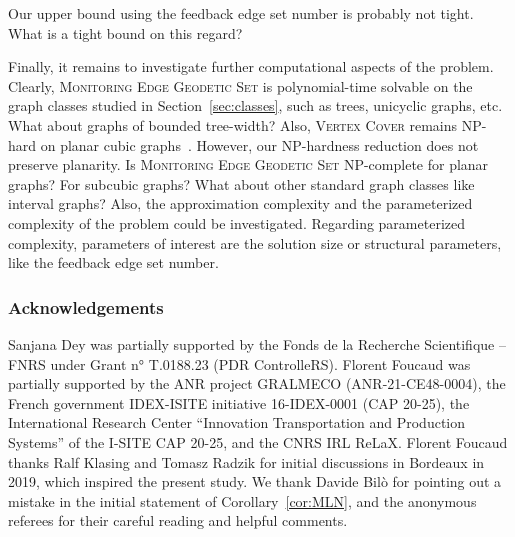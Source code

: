 \documentclass[10pt,a4paper]{article}
\begin{document}
Our upper bound using the feedback edge set number is probably not tight. What is a tight bound on this regard?

Finally, it remains to investigate further computational aspects of the problem. Clearly, \textsc{Monitoring Edge Geodetic Set} is polynomial-time solvable on the graph classes studied in Section~\ref{sec:classes}, such as trees, unicyclic graphs, etc. What about graphs of bounded tree-width? Also, \textsc{Vertex Cover} remains NP-hard on planar cubic graphs~\cite{mohar2001face}. However, our NP-hardness reduction does not preserve planarity. Is \textsc{Monitoring Edge Geodetic Set} NP-complete for planar graphs? For subcubic graphs? What about other standard graph classes like interval graphs? Also, the approximation complexity and the parameterized complexity of the problem could be investigated. Regarding parameterized complexity, parameters of interest are the solution size or structural parameters, like the feedback edge set number.

\subsubsection*{Acknowledgements} Sanjana Dey was partially supported by the Fonds de la Recherche Scientifique – FNRS under Grant n° T.0188.23 (PDR ControlleRS). Florent Foucaud was partially supported by the ANR project GRALMECO (ANR-21-CE48-0004), the French government IDEX-ISITE initiative 16-IDEX-0001 (CAP 20-25), the International Research Center ``Innovation Transportation and Production Systems'' of the I-SITE CAP 20-25, and the CNRS IRL ReLaX. Florent Foucaud thanks Ralf Klasing and Tomasz Radzik for initial discussions in Bordeaux in 2019, which inspired the present study. We thank Davide Bil\`o for pointing out a mistake in the initial statement of Corollary~\ref{cor:MLN}, and the anonymous referees for their careful reading and helpful comments.
\end{document}
